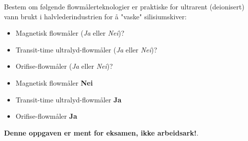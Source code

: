 

Bestem om følgende flowmålerteknologier er praktiske for ultrarent (deionisert) vann brukt i halvlederindustrien for å "vaske" silisiumskiver:

\begin{itemize}
\item{} Magnetisk flowmåler ({\it Ja} eller {\it Nei})?
\vskip 10pt
\item{} Transit-time ultralyd-flowmåler ({\it Ja} eller {\it Nei})?
\vskip 10pt
\item{} Orifise-flowmåler ({\it Ja} eller {\it Nei})?
\end{itemize}







\begin{itemize}
\item{} Magnetisk flowmåler {\bf Nei}
\item{} Transit-time ultralyd-flowmåler {\bf Ja}
\item{} Orifise-flowmåler {\bf Ja}
\end{itemize}







{\bf Denne oppgaven er ment for eksamen, ikke arbeidsark!}.

